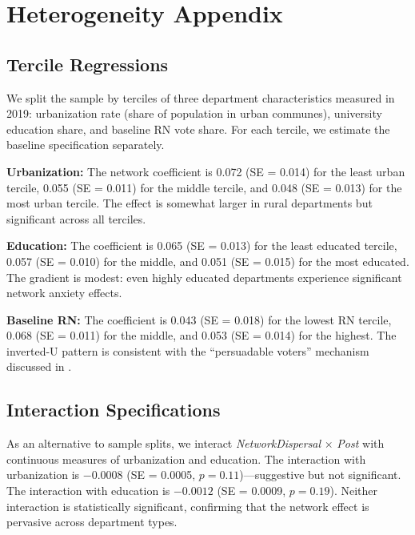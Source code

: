 \documentclass[12pt]{article}
\begin{document}
\section{Heterogeneity Appendix}
\label{app:heterogeneity}

\subsection{Tercile Regressions}

We split the sample by terciles of three department characteristics measured in 2019: urbanization rate (share of population in urban communes), university education share, and baseline RN vote share. For each tercile, we estimate the baseline specification separately.

\textbf{Urbanization:} The network coefficient is 0.072 (SE = 0.014) for the least urban tercile, 0.055 (SE = 0.011) for the middle tercile, and 0.048 (SE = 0.013) for the most urban tercile. The effect is somewhat larger in rural departments but significant across all terciles.

\textbf{Education:} The coefficient is 0.065 (SE = 0.013) for the least educated tercile, 0.057 (SE = 0.010) for the middle, and 0.051 (SE = 0.015) for the most educated. The gradient is modest: even highly educated departments experience significant network anxiety effects.

\textbf{Baseline RN:} The coefficient is 0.043 (SE = 0.018) for the lowest RN tercile, 0.068 (SE = 0.011) for the middle, and 0.053 (SE = 0.014) for the highest. The inverted-U pattern is consistent with the ``persuadable voters'' mechanism discussed in .

\subsection{Interaction Specifications}

As an alternative to sample splits, we interact \textit{NetworkDispersal} $\times$ \textit{Post} with continuous measures of urbanization and education. The interaction with urbanization is $-0.0008$ (SE = 0.0005, $p = 0.11$)---suggestive but not significant. The interaction with education is $-0.0012$ (SE = 0.0009, $p = 0.19$). Neither interaction is statistically significant, confirming that the network effect is pervasive across department types.
\end{document}
